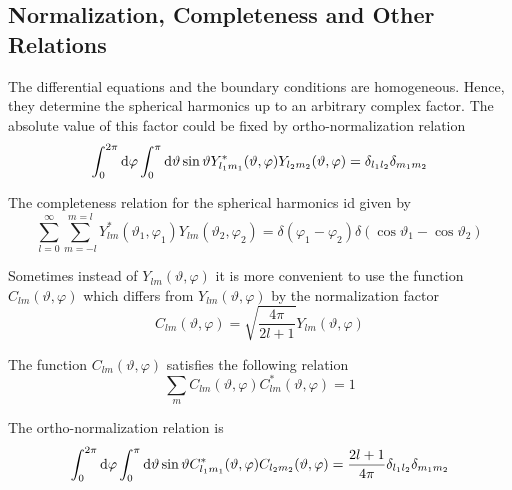 \subsection{Normalization, Completeness and Other Relations}
\par{The differential equations  and the boundary conditions
   are homogeneous. Hence, they determine the spherical
  harmonics up to an arbitrary complex factor. The absolute value of this
  factor could be fixed by ortho-normalization relation}
\begin{equation}
\int_{0}^{2\pi}\text{d} \varphi\int_{0}^{\pi}\text{d} \vartheta \sin \vartheta Y_{l_1m_1}^{*}(\vartheta,\varphi)Y_{l_2m_2}(\vartheta,\varphi)=\delta_{l_1l_2}\delta_{m_1m_2}
\end{equation}
\par{The completeness relation for the spherical harmonics id given by}
\begin{equation}
\label{complet}
\sum_{l=0}^{\infty}\sum_{m=-l}^{m=l}Y_{lm}^{*}(\vartheta_1,\varphi_1)Y_{lm}(\vartheta_2,\varphi_2)=\delta(\varphi_1-\varphi_2)\delta(\cos
\vartheta_1-\cos \vartheta_2)
\end{equation}
\par{Sometimes instead of $Y_{lm}(\vartheta,\varphi)$ it is more convenient to
  use the function $C_{lm}(\vartheta,\varphi)$} which differs from
$Y_{lm}(\vartheta,\varphi)$ by the normalization factor
\begin{equation}
C_{lm}(\vartheta,\varphi)=\sqrt{\frac{4\pi}{2l+1}}Y_{lm}(\vartheta,\varphi) 
\end{equation}
\par{The function $C_{lm}(\vartheta,\varphi)$ satisfies the following relation}
\begin{equation}
\sum_{m}C_{lm}(\vartheta,\varphi)C_{lm}^{*}(\vartheta,\varphi)=1
\end{equation}
\par{The ortho-normalization relation is}
\begin{equation}
\int_{0}^{2\pi}\text{d} \varphi\int_{0}^{\pi}\text{d} \vartheta \sin \vartheta C_{l_1m_1}^{*}(\vartheta,\varphi)C_{l_2m_2}(\vartheta,\varphi)=\frac{2l+1}{4\pi}\delta_{l_1l_2}\delta_{m_1m_2}
\end{equation}
